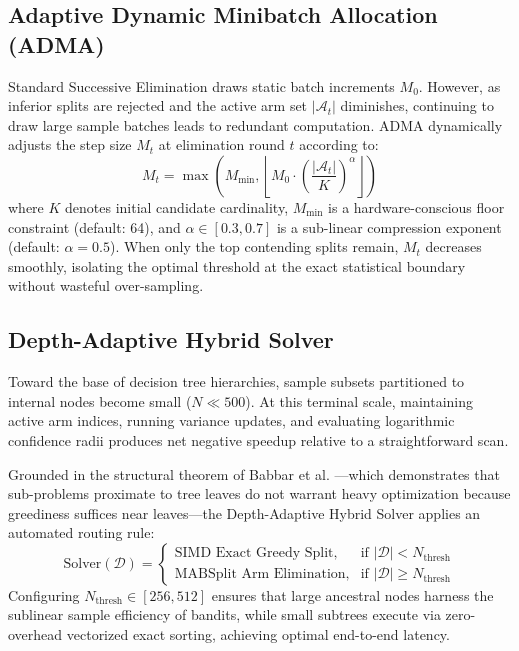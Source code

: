 \subsection{Adaptive Dynamic Minibatch Allocation (ADMA)}
Standard Successive Elimination draws static batch increments $M_0$. However, as inferior splits are rejected and the active arm set $|\mathcal{A}_t|$ diminishes, continuing to draw large sample batches leads to redundant computation. ADMA dynamically adjusts the step size $M_t$ at elimination round $t$ according to:
\begin{equation}
M_t = \max\left( M_{\min}, \left\lfloor M_0 \cdot \left( \frac{|\mathcal{A}_t|}{K} \right)^\alpha \right\rfloor \right)
\label{eq:adma}
\end{equation}
where $K$ denotes initial candidate cardinality, $M_{\min}$ is a hardware-conscious floor constraint (default: 64), and $\alpha \in [0.3, 0.7]$ is a sub-linear compression exponent (default: $\alpha = 0.5$). When only the top contending splits remain, $M_t$ decreases smoothly, isolating the optimal threshold at the exact statistical boundary without wasteful over-sampling.

\subsection{Depth-Adaptive Hybrid Solver}
Toward the base of decision tree hierarchies, sample subsets partitioned to internal nodes become small ($N \ll 500$). At this terminal scale, maintaining active arm indices, running variance updates, and evaluating logarithmic confidence radii produces net negative speedup relative to a straightforward scan.

Grounded in the structural theorem of Babbar et al. \cite{babbar2024near}—which demonstrates that sub-problems proximate to tree leaves do not warrant heavy optimization because greediness suffices near leaves—the Depth-Adaptive Hybrid Solver applies an automated routing rule:
\begin{equation}
\text{Solver}(\mathcal{D}) = \begin{cases} 
\text{SIMD Exact Greedy Split}, & \text{if } |\mathcal{D}| < N_{\text{thresh}} \\
\text{MABSplit Arm Elimination}, & \text{if } |\mathcal{D}| \ge N_{\text{thresh}}
\end{cases}
\end{equation}
Configuring $N_{\text{thresh}} \in [256, 512]$ ensures that large ancestral nodes harness the sublinear sample efficiency of bandits, while small subtrees execute via zero-overhead vectorized exact sorting, achieving optimal end-to-end latency.
